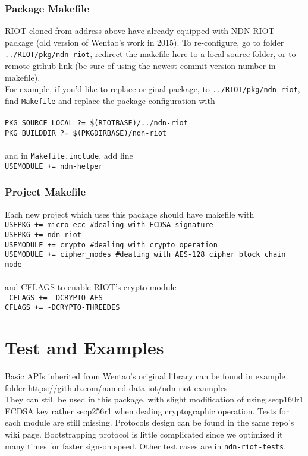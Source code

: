 \documentclass[a4paper, 11pt]{article}
\begin{document}
        \subsubsection*{Package Makefile}
        RIOT cloned from address above have already equipped with NDN-RIOT package (old version of Wentao's work in 2015). To re-configure, go to folder \texttt{../RIOT/pkg/ndn-riot}, redirect the makefile here to a local source folder, or to remote github link (be sure of using the newest commit version number in makefile).\\
        For example, if you'd like to replace original package, to \texttt{../RIOT/pkg/ndn-riot}, find \texttt{Makefile} and replace the package configuration with \\ \\
        \texttt{PKG\_SOURCE\_LOCAL ?= \$(RIOTBASE)/../ndn-riot \\
                PKG\_BUILDDIR ?= \$(PKGDIRBASE)/ndn-riot} \\ \\
        and in \texttt{Makefile.include}, add line \\
        \texttt{USEMODULE += ndn-helper}

        \subsubsection*{Project Makefile}
        Each new project which uses this package should have makefile with \\
        \texttt{USEPKG += micro-ecc \hfill \#dealing with ECDSA signature\\
                USEPKG += ndn-riot  \\
                USEMODULE += crypto \hfill \#dealing with crypto operation\\
                USEMODULE += cipher\_modes \hfill \#dealing with AES-128 cipher block chain mode}\\ \\
        and CFLAGS to enable RIOT's crypto module \\
        \texttt{
                CFLAGS += -DCRYPTO-AES \\
                CFLAGS += -DCRYPTO-THREEDES} \\
    
        \section*{Test and Examples}
        Basic APIs inherited from Wentao's original library can be found in example folder \url{https://github.com/named-data-iot/ndn-riot-examples}\\ They can still be used in this package, with slight modification of using secp160r1 ECDSA key rather secp256r1 when dealing cryptographic operation. Tests for each module are still missing. Protocols design can be found in the same repo's wiki page. Bootstrapping protocol is little complicated since we optimized it many times for faster sign-on speed. 
        Other test cases are in \texttt{ndn-riot-tests}.
\end{document}
